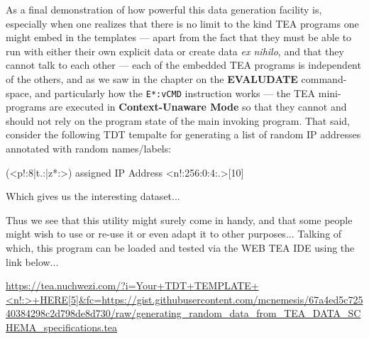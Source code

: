 \documentclass[a4paper, 18pt]{book} %
\begin{document}
 As a final demonstration of how powerful this data generation facility is, especially when one realizes that there is no limit to the kind TEA programs one might embed in the templates --- apart from the fact that they must be able to run with either their own explicit data or create data \textit{ex nihilo}, and that they cannot talk to each other --- each of the embedded TEA programs is independent of the others, and as we saw in the chapter on the \textbf{EVALUDATE} command-space, and particularly how the \texttt{E*:vCMD} instruction works --- the TEA mini-programs are executed in \textbf{Context-Unaware Mode} so that they cannot and should not rely on the program state of the main invoking program. That said, consider the following TDT tempalte for generating a list of random IP addresses annotated with random names/labels:
 
 
   \begin{tcbverbatim}[title=Example Arbitrary Format Data Generation Schema]
 (<p!:8|t.:|z*:>) assigned IP Address <n!:256:0:4:.>[10]
  \end{tcbverbatim}

 \vspace{2em}
 
 Which gives us the interesting dataset...
 
     \begin{tcbverbatim}
  \end{tcbverbatim} 
 
 
 \vspace{2em}
 
 
 Thus we see that this utility might surely come in handy, and that some people might wish to use or re-use it or even adapt it to other purposes... Talking of which, this program can be loaded and tested via the WEB TEA IDE using the link below...
 
 
\vspace{1em}

 \url{https://tea.nuchwezi.com/?i=Your+TDT+TEMPLATE+<n!:>+HERE[5]&fc=https://gist.githubusercontent.com/mcnemesis/67a4ed5c72540384298c2d798de8d730/raw/generating_random_data_from_TEA_DATA_SCHEMA_specifications.tea}
\end{document}
